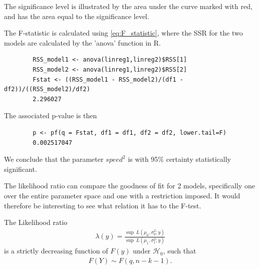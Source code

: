 \begin{example}
    The significance level is illustrated by the area under the curve marked with red, and has the area equal to the significance level.
    
    The F-statistic is calculated using \eqref{eq:F_statistic}, where the SSR for the two models are calculated by the 'anova' function in R. 
    \begin{lstlisting}
        RSS_model1 <- anova(linreg1,linreg2)$RSS[1]
        RSS_model2 <- anova(linreg1,linreg2)$RSS[2]
        Fstat <- ((RSS_model1 - RSS_model2)/(df1 - df2))/((RSS_model2)/df2)
        2.296027
    \end{lstlisting}
    
    The associated p-value is then
    
    \begin{lstlisting}
        p <- pf(q = Fstat, df1 = df1, df2 = df2, lower.tail=F)
        0.002517047
    \end{lstlisting}
    
    We conclude that the parameter $speed^2$ is with 95\% certainty statistically significant.
\end{example}

The likelihood ratio can compare the goodness of fit for 2 models, specifically one over the entire parameter space and one with a restriction imposed.
It would therefore be interesting to see what relation it has to the F-test.

\begin{theorem}
\label{th:Likelihood_ratio_linear_models}
    The Likelihood ratio
    \begin{align*}
        \lambda(y) = \frac{\sup \ L(\mu_0, \sigma_0^2; y)}{\sup \ L(\mu_1, \sigma_1^2; y)}
    \end{align*}
    is a strictly decreasing function of $F(y)$ under $\mathcal{H}_0$, such that
    \begin{align*}
        F(Y) \sim F(q, n-k-1).
    \end{align*}
\end{theorem}

